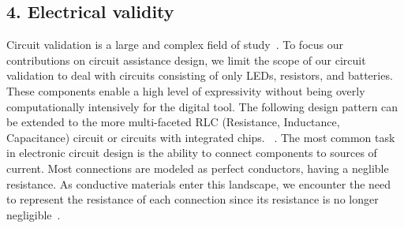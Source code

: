 \documentclass{sigchi}
\begin{document}
\subsection{4. Electrical validity}
  Circuit validation is a large and complex field of study~\cite{Patra:2007vo}. To focus our contributions on circuit assistance design, we limit the scope of our circuit validation to deal with circuits consisting of only LEDs, resistors, and batteries. These components enable a high level of expressivity without being overly computationally intensively for the digital tool. The following design pattern can be extended to the more multi-faceted RLC (Resistance, Inductance, Capacitance) circuit or circuits with integrated chips. ~\cite{mellis_microcontrollers_2013}.
  The most common task in electronic circuit design is the ability to connect components to sources of current. Most connections are modeled as perfect conductors, having a neglible resistance. As conductive materials enter this landscape, we encounter the need to represent the resistance of each connection since its resistance is no longer negligible~\cite{Buechley:2012ju}. 
\end{document}
